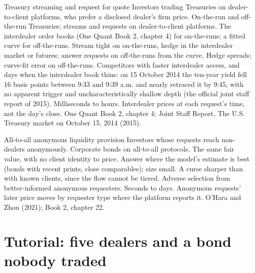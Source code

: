 \begin{strategyfile}{Treasury streaming and request for quote}\label{strat:hf:bond-and-etf-request-for-quote-market-making:ust}
 Investors trading Treasuries on dealer-to-client platforms, who prefer a disclosed dealer's firm price.
 On-the-run and off-the-run Treasuries; streams and requests on dealer-to-client platforms.
 The interdealer order books (One Quant Book 2, chapter 4) for on-the-runs; a fitted curve for off-the-runs.
 Stream tight on on-the-runs, hedge in the interdealer market or futures; answer requests on off-the-runs from the curve.
 Hedge spreads; curve-fit error on off-the-runs.
 Competitors with faster interdealer access, and days when the interdealer book thins: on 15 October 2014 the ten-year yield
fell 16 basis points between 9:33 and 9:39 a.m. and nearly retraced it by 9:45, with no apparent trigger and uncharacteristically shallow depth
(the official joint staff report of 2015).
 Milliseconds to hours.
 Interdealer prices at each request's time, not the day's close.
 One Quant Book 2, chapter 4; Joint Staff Report, The U.S. Treasury market on October 15, 2014 (2015).
\end{strategyfile}

\begin{strategyfile}{All-to-all anonymous liquidity provision}\label{strat:hf:bond-and-etf-request-for-quote-market-making:a2a}
 Investors whose requests reach non-dealers anonymously.
 Corporate bonds on all-to-all protocols.
 The same fair value, with no client identity to price.
 Answer where the model's estimate is best (bonds with recent prints, close comparables); size small.
 A curse sharper than with known clients, since the flow cannot be tiered.
 Adverse selection from better-informed anonymous requesters.
 Seconds to days.
 Anonymous requests' later price moves by requester type where the platform reports it.
 O'Hara and Zhou (2021); Book 2, chapter 22.
\end{strategyfile}

\section{Tutorial: five dealers and a bond nobody traded}\label{tut:hf:bond-and-etf-request-for-quote-market-making:tut}

